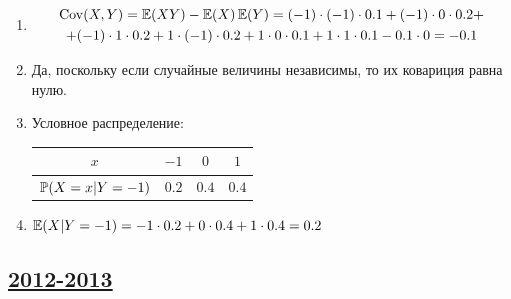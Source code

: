 \begin{enumerate}
\begin{enumerate}
\item
\begin{multline*}
\Cov(X, Y) = \E(XY) - \E(X) \E(Y)  = (-1)\cdot (-1) \cdot 0.1 + (-1) \cdot 0 \cdot 0.2 + \\
+ (-1) \cdot 1 \cdot 0.2 + 1 \cdot (-1) \cdot 0.2 + 1 \cdot 0 \cdot 0.1 + 1 \cdot 1 \cdot 0.1 -
0.1 \cdot 0 = -0.1
\end{multline*}
\item Да, поскольку если случайные величины независимы, то их ковариция равна нулю.
\item Условное распределение:
\begin{center}
\begin{tabular}{@{}cccc@{}}
\toprule
$x$    & $-1$  & $0$   & $1$   \\ \midrule
$\P(X = x |Y=-1)$ & $0.2$ & $0.4$ & $0.4$ \\ \bottomrule
\end{tabular}
\end{center}
\item $\E(X | Y = -1) = -1 \cdot 0.2 + 0 \cdot 0.4 + 1 \cdot 0.4 = 0.2$
\end{enumerate}
\end{enumerate}




\subsection[2012-2013]{\hyperref[sec:kr_01_2012_2013]{2012-2013}}
\label{sec:sol_kr_01_2012_2013}

